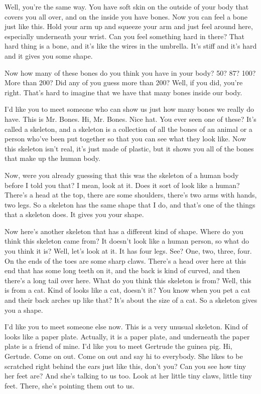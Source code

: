 Well, you're the same way. You have soft skin on the outside of your body that covers you all over, and on the inside you have bones. Now you can feel a bone just like this. Hold your arm up and squeeze your arm and just feel around here, especially underneath your wrist. Can you feel something hard in there? That hard thing is a bone, and it's like the wires in the umbrella. It's stiff and it's hard and it gives you some shape.

Now how many of these bones do you think you have in your body? 50? 87? 100? More than 200? Did any of you guess more than 200? Well, if you did, you're right. That's hard to imagine that we have that many bones inside our body.

I'd like you to meet someone who can show us just how many bones we really do have. This is Mr. Bones. Hi, Mr. Bones. Nice hat. You ever seen one of these? It's called a skeleton, and a skeleton is a collection of all the bones of an animal or a person who've been put together so that you can see what they look like. Now this skeleton isn't real, it's just made of plastic, but it shows you all of the bones that make up the human body.

Now, were you already guessing that this was the skeleton of a human body before I told you that? I mean, look at it. Does it sort of look like a human? There's a head at the top, there are some shoulders, there's two arms with hands, two legs. So a skeleton has the same shape that I do, and that's one of the things that a skeleton does. It gives you your shape.

Now here's another skeleton that has a different kind of shape. Where do you think this skeleton came from? It doesn't look like a human person, so what do you think it is? Well, let's look at it. It has four legs. See? One, two, three, four. On the ends of the toes are some sharp claws. There's a head over here at this end that has some long teeth on it, and the back is kind of curved, and then there's a long tail over here. What do you think this skeleton is from? Well, this is from a cat. Kind of looks like a cat, doesn't it? You know when you pet a cat and their back arches up like that? It's about the size of a cat. So a skeleton gives you a shape.

I'd like you to meet someone else now. This is a very unusual skeleton. Kind of looks like a paper plate. Actually, it is a paper plate, and underneath the paper plate is a friend of mine. I'd like you to meet Gertrude the guinea pig. Hi, Gertude. Come on out. Come on out and say hi to everybody. She likes to be scratched right behind the ears just like this, don't you? Can you see how tiny her feet are? And she's talking to us too. Look at her little tiny claws, little tiny feet. There, she's pointing them out to us.

